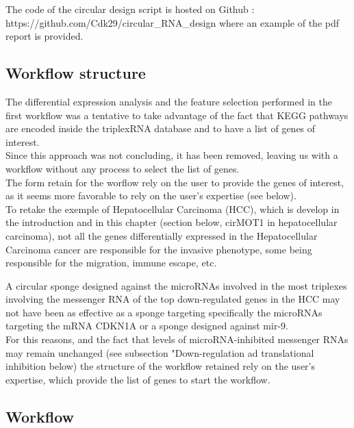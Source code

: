 \documentclass[a4paper,12pt]{report}
\begin{document}
The code of the circular design script is hosted on Github :\\ https://github.com/Cdk29/circular\_RNA\_design where an example of the pdf report is provided.

\subsection{Workflow structure}

The differential expression analysis and the feature selection performed in the first workflow was a tentative to take advantage of the fact that KEGG pathways are encoded inside the triplexRNA database and to have a list of genes of interest.\\

Since this approach was not concluding, it has been removed, leaving us with a workflow without any process to select the list of genes.\\

The form retain for the worflow rely on the user to provide the genes of interest, as it seems more favorable to rely on the user's expertise (see below).\\ 

To retake the exemple of Hepatocellular Carcinoma (HCC), which is develop in the introduction and in this chapter (section below, cirMOT1 in hepatocellular carcinoma), not all the genes differentially expressed in the Hepatocellular Carcinoma cancer are responsible for the invasive phenotype\cite{example}, some being responsible for the migration, immune escape, etc\cite{example}.

A circular sponge designed against the microRNAs involved in the most triplexes involving the messenger RNA of the top down-regulated genes in the HCC may not have been as effective as a sponge targeting specifically the microRNAs targeting the mRNA CDKN1A or a sponge designed against mir-9. \\

For this reasons, and the fact that levels of microRNA-inhibited messenger RNAs may remain unchanged (see subsection "Down-regulation ad translational inhibition below) the structure of the workflow retained rely on the user's expertise, which provide the list of genes to start the workflow.\\

\subsection{Workflow}
\end{document}
